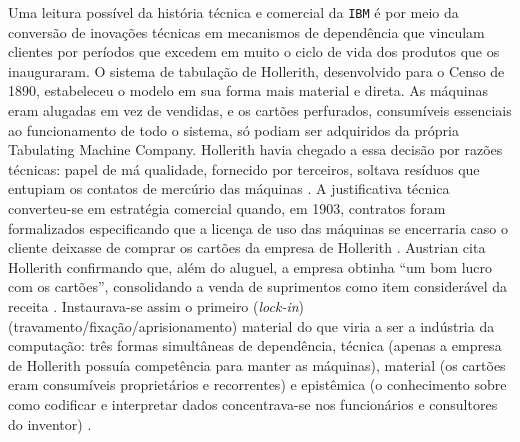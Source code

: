 Uma leitura possível da história técnica e comercial da \texttt{IBM} é por meio  da conversão de inovações técnicas em mecanismos de dependência que vinculam clientes por períodos que excedem em muito o ciclo de vida dos produtos que os inauguraram. O sistema de tabulação de Hollerith, desenvolvido para o Censo de 1890, estabeleceu o modelo em sua forma mais material e direta. As máquinas eram alugadas em vez de vendidas, e os cartões perfurados, consumíveis essenciais ao funcionamento de todo o sistema, só podiam ser adquiridos da própria Tabulating Machine Company. Hollerith havia chegado a essa decisão por razões técnicas: papel de má qualidade, fornecido por terceiros, soltava resíduos que entupiam os contatos de mercúrio das máquinas \parencite[p.~70]{Austrian1982Hollerith}. A justificativa técnica converteu-se em estratégia comercial quando, em 1903, contratos foram formalizados especificando que a licença de uso das máquinas se encerraria caso o cliente deixasse de comprar os cartões da empresa de Hollerith \parencite[pp.~206-207]{Austrian1982Hollerith}. Austrian cita Hollerith confirmando que, além do aluguel, a empresa obtinha \enquote{um bom lucro com os cartões}, consolidando a venda de suprimentos como item considerável da receita \parencite[p.~249]{Austrian1982Hollerith}. Instaurava-se assim o primeiro (\textit{lock-in}) (travamento/fixação/aprisionamento) material do que viria a ser a indústria da computação: três formas simultâneas de dependência, técnica (apenas a empresa de Hollerith possuía competência para manter as máquinas), material (os cartões eram consumíveis proprietários e recorrentes) e epistêmica (o conhecimento sobre como codificar e interpretar dados concentrava-se nos funcionários e consultores do inventor) \parencite{Austrian1982Hollerith}.

